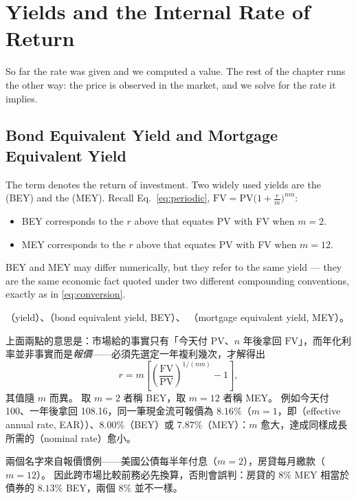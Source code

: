 \section{Yields and the Internal Rate of Return}


So far the rate was given and we computed a value.
The rest of the chapter runs the other way: the price is observed in the market, and we solve for the rate it implies.

\subsection{Bond Equivalent Yield and Mortgage Equivalent Yield}

The term  denotes the return of investment.
Two widely used yields are the  (BEY) and the  (MEY).
Recall Eq.~\eqref{eq:periodic}, $\mathrm{FV} = \mathrm{PV}\bigl(1+\frac{r}{m}\bigr)^{nm}$:

\begin{itemize}[nosep]
	\item BEY corresponds to the $r$ above that equates PV with FV when $m = 2$.
	\item MEY corresponds to the $r$ above that equates PV with FV when $m = 12$.
\end{itemize}

\begin{observation}
	BEY and MEY may differ numerically, but they refer to the same yield --- they are the same economic fact quoted under two different compounding conventions, exactly as in \autoref{eq:conversion}.
\end{observation}

\suppstart
\begin{remark}
	（yield）、（bond equivalent yield, BEY）、 （mortgage equivalent yield, MEY）。

	上面兩點的意思是：市場給的事實只有「今天付 $\mathrm{PV}$、$n$ 年後拿回 $\mathrm{FV}$」，而年化利率並非事實而是\emph{報價}——必須先選定一年複利幾次，才解得出
	\[
		r = m\left[\left(\frac{\mathrm{FV}}{\mathrm{PV}}\right)^{1/(nm)} - 1\right] ,
	\]
	其值隨 $m$ 而異。
	取 $m = 2$ 者稱 BEY，取 $m = 12$ 者稱 MEY。
	例如今天付 100、一年後拿回 108.16，同一筆現金流可報價為 $8.16\%$（$m = 1$，即（effective annual rate, EAR））、$8.00\%$（BEY）或 $7.87\%$（MEY）：$m$ 愈大，達成同樣成長所需的（nominal rate）愈小。

	兩個名字來自報價慣例——美國公債每半年付息（$m = 2$），房貸每月繳款（$m = 12$）。
	因此跨市場比較前務必先換算，否則會誤判：房貸的 $8\%$ MEY 相當於債券的 $8.13\%$ BEY，兩個 $8\%$ 並不一樣。
\end{remark}
\suppend

